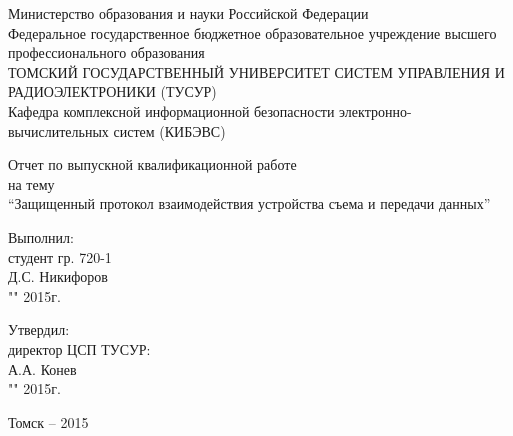 \newpage
{}

\begin{center}
Министерство образования и науки Российской Федерации\\
Федеральное государственное бюджетное образовательное учреждение высшего профессионального образования\\
ТОМСКИЙ ГОСУДАРСТВЕННЫЙ УНИВЕРСИТЕТ СИСТЕМ УПРАВЛЕНИЯ И РАДИОЭЛЕКТРОНИКИ (ТУСУР)\\
Кафедра комплексной информационной безопасности электронно-вычислительных систем (КИБЭВС)\\
\end{center}

\vspace{2cm}

\begin{center}
Отчет по выпускной квалификационной работе \\
на тему \\
``Защищенный протокол взаимодействия устройства съема и передачи данных''
\end{center}

\vspace{2cm}

\begin{flushright}
Выполнил: \\
студент гр. 720-1 \\
\underline{\hspace{2.5cm}}Д.С. Никифоров \\
"\underline{\hspace{1cm}}"\underline{\hspace{3cm}} 2015г.\\
\end{flushright}

\begin{flushright}
Утвердил: \\
директор ЦСП ТУСУР: \\
\underline{\hspace{2.5cm}}А.А. Конев \\
"\underline{\hspace{1cm}}"\underline{\hspace{3cm}} 2015г.\\
\end{flushright}

\vfill
\begin{center}
Томск -- 2015
\end{center}